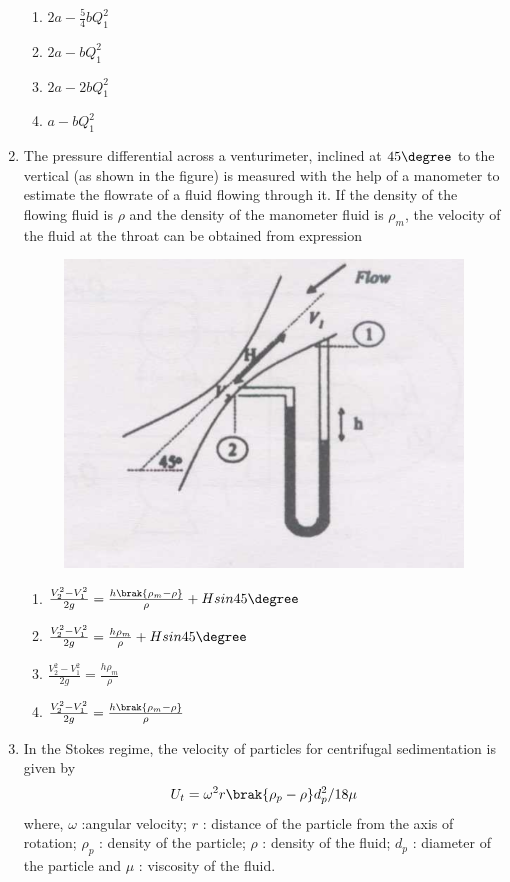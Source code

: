 \documentclass[journal,12pt,onecolumn]{IEEEtran}
\theoremstyle{remark}
\begin{document}
\begin{enumerate}
\begin{enumerate}
    \item $2a-\frac{5}{4}bQ^2_1$
    \item $2a-bQ_1^2$
    \item $2a-2bQ_1^2$
    \item $a-bQ_1^2$
\end{enumerate}

    \item The pressure differential across a venturimeter, inclined at $45\degree $ to the vertical (as shown in the figure) is measured with the help of a manometer to estimate the flowrate of a fluid flowing through it. If the density of the flowing fluid is $\rho$ and the density of the manometer fluid is $\rho_m$, the velocity of the fluid at the throat can be obtained from expression

\begin{figure}[H]
    \centering
    \includegraphics[width=0.5\linewidth]{figs/39.png}
    \caption{}
    \label{fig:39}
\end{figure}

\begin{enumerate}
    \item $\frac{V_2^2-V_1^2}{2g}=\frac{h\brak{\rho _m-\rho}}{\rho}+Hsin45\degree $
     \item $\frac{V_2^2-V_1^2}{2g}=\frac{h\rho_m}{\rho}+Hsin45\degree $
      \item $\frac{V_2^2-V_1^2}{2g}=\frac{h\rho _m}{\rho}$
      \item $\frac{V_2^2-V_1^2}{2g}=\frac{h\brak{\rho_m-\rho}}{\rho}$
\end{enumerate}
\newpage
    \item In the Stokes regime, the velocity of particles for centrifugal sedimentation is given by 
    \begin{align*}
        U_t=\omega^2r\brak{\rho_p-\rho}d^2_p/18\mu
    \end{align*}
    where, $\omega$ :angular velocity; $r$ : distance of the particle from the axis of rotation; $\rho_p$ : density of the particle; $\rho$  : density of the fluid; $d_p$ : diameter of the particle and $\mu$ : viscosity of the fluid.


\end{enumerate}
\end{document}
